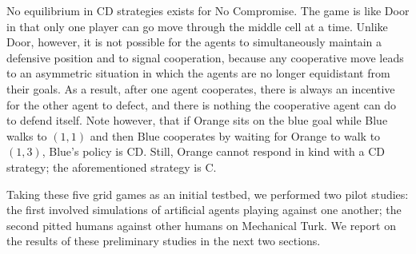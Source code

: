 No equilibrium in CD strategies exists for No Compromise.  The game
is like Door in that only one player can go move through the middle
cell at a time.  Unlike Door, however, it is not possible for the
agents to simultaneously maintain a defensive position and to signal
cooperation, because any cooperative move leads to an asymmetric
situation in which the agents are no longer equidistant from their
goals.
As a result, after one agent cooperates, there is always an incentive
for the other agent to defect, and there is nothing the cooperative
agent can do to defend itself.  Note however, that if Orange sits on
the blue goal while Blue walks to $(1,1)$ and then Blue cooperates by
waiting for Orange to walk to $(1,3)$, Blue's policy is CD.  Still,
Orange cannot respond in kind with a CD strategy; the aforementioned
strategy is C.

Taking these five grid games as an initial testbed, we performed two
pilot studies: the first involved simulations of artificial agents
playing against one another; the second pitted humans against other
humans on Mechanical Turk.  We report on the results of these
preliminary studies in the next two sections.  

